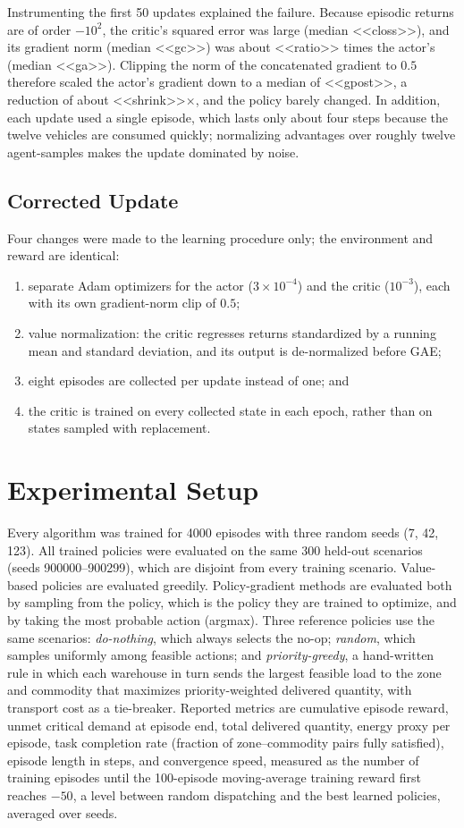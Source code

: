 \documentclass[conference]{IEEEtran}
\begin{document}
Instrumenting the first 50 updates explained the failure. Because episodic returns are of order $-10^{2}$, the critic's squared error was large (median <<closs>>), and its gradient norm (median <<gc>>) was about <<ratio>> times the actor's (median <<ga>>). Clipping the norm of the concatenated gradient to $0.5$ therefore scaled the actor's gradient down to a median of <<gpost>>, a reduction of about <<shrink>>$\times$, and the policy barely changed. In addition, each update used a single episode, which lasts only about four steps because the twelve vehicles are consumed quickly; normalizing advantages over roughly twelve agent-samples makes the update dominated by noise.

\subsection{Corrected Update}
\label{sec:fix}
Four changes were made to the learning procedure only; the environment and reward are identical:
\begin{enumerate}
\item separate Adam optimizers for the actor ($3\times10^{-4}$) and the critic ($10^{-3}$), each with its own gradient-norm clip of $0.5$;
\item value normalization: the critic regresses returns standardized by a running mean and standard deviation, and its output is de-normalized before GAE;
\item eight episodes are collected per update instead of one; and
\item the critic is trained on every collected state in each epoch, rather than on states sampled with replacement.
\end{enumerate}

\section{Experimental Setup}
Every algorithm was trained for 4000 episodes with three random seeds (7, 42, 123). All trained policies were evaluated on the same 300 held-out scenarios (seeds 900000--900299), which are disjoint from every training scenario. Value-based policies are evaluated greedily. Policy-gradient methods are evaluated both by sampling from the policy, which is the policy they are trained to optimize, and by taking the most probable action (argmax). Three reference policies use the same scenarios: \emph{do-nothing}, which always selects the no-op; \emph{random}, which samples uniformly among feasible actions; and \emph{priority-greedy}, a hand-written rule in which each warehouse in turn sends the largest feasible load to the zone and commodity that maximizes priority-weighted delivered quantity, with transport cost as a tie-breaker. Reported metrics are cumulative episode reward, unmet critical demand at episode end, total delivered quantity, energy proxy per episode, task completion rate (fraction of zone--commodity pairs fully satisfied), episode length in steps, and convergence speed, measured as the number of training episodes until the 100-episode moving-average training reward first reaches $-50$, a level between random dispatching and the best learned policies, averaged over seeds.
\end{document}
